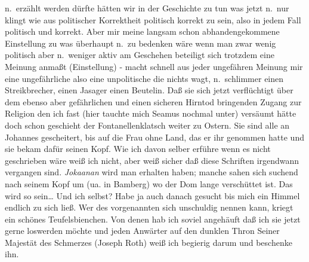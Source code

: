 \documentclass[
]{article}
\begin{document}
n.~erzählt werden dürfte hätten wir in der Geschichte zu tun was jetzt
n.~nur klingt wie aus politischer Korrektheit politisch korrekt zu sein,
also in jedem Fall politisch und korrekt. Aber mir meine langsam schon
abhandengekommene Einstellung zu was überhaupt n.~zu bedenken wäre wenn
man zwar wenig politisch aber n.~weniger aktiv am Geschehen beteiligt
sich trotzdem eine Meinung anmaßt (Einstellung) - macht schnell aus
jeder ungefähren Meinung mir eine ungefährliche also eine unpolitische
die nichts wagt, n.~schlimmer einen Streikbrecher, einen Jasager einen
Beutelin. Daß sie sich jetzt verflüchtigt über dem ebenso aber
gefährlichen und einen sicheren Hirntod bringenden Zugang zur Religion
den ich fast (hier tauchte mich Seamus nochmal unter) versäumt hätte
doch schon geschieht der Fontanellenklatsch weiter zu Ostern. Sie sind
alle an Johannes gescheitert, bis auf die Frau ohne Land, das er ihr
genommen hatte und sie bekam dafür seinen Kopf. Wie ich davon selber
erführe wenn es nicht geschrieben wäre weiß ich nicht, aber weiß sicher
daß diese Schriften irgendwann vergangen sind. \emph{Jokaanan} wird man
erhalten haben; manche sahen sich suchend nach seinem Kopf um (ua. in
Bamberg) wo der Dom lange verschüttet ist. Das wird so sein\ldots{} Und
ich selbst? Habe ja auch danach gesucht bis mich ein Himmel endlich zu
sich ließ. Wer des vorgenannten sich unschuldig nennen kann, kriegt ein
schönes Teufelsbienchen. Von denen hab ich soviel angehäuft daß ich sie
jetzt gerne loswerden möchte und jeden Anwärter auf den dunklen Thron
Seiner Majestät des Schmerzes (Joseph Roth) weiß ich begierig darum und
beschenke ihn.
\end{document}
